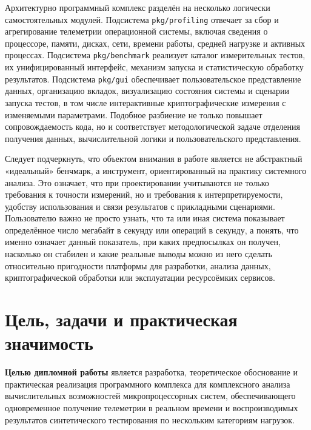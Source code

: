 Архитектурно программный комплекс разделён на несколько логически самостоятельных модулей. Подсистема \texttt{pkg/profiling} отвечает за сбор и агрегирование телеметрии операционной системы, включая сведения о процессоре, памяти, дисках, сети, времени работы, средней нагрузке и активных процессах. Подсистема \texttt{pkg/benchmark} реализует каталог измерительных тестов, их унифицированный интерфейс, механизм запуска и статистическую обработку результатов. Подсистема \texttt{pkg/gui} обеспечивает пользовательское представление данных, организацию вкладок, визуализацию состояния системы и сценарии запуска тестов, в том числе интерактивные криптографические измерения с изменяемыми параметрами. Подобное разбиение не только повышает сопровождаемость кода, но и соответствует методологической задаче отделения получения данных, вычислительной логики и пользовательского представления.

Следует подчеркнуть, что объектом внимания в работе является не абстрактный «идеальный» бенчмарк, а инструмент, ориентированный на практику системного анализа. Это означает, что при проектировании учитываются не только требования к точности измерений, но и требования к интерпретируемости, удобству использования и связи результатов с прикладными сценариями. Пользователю важно не просто узнать, что та или иная система показывает определённое число мегабайт в секунду или операций в секунду, а понять, что именно означает данный показатель, при каких предпосылках он получен, насколько он стабилен и какие реальные выводы можно из него сделать относительно пригодности платформы для разработки, анализа данных, криптографической обработки или эксплуатации ресурсоёмких сервисов.

\section*{Цель, задачи и практическая значимость}

\textbf{Целью дипломной работы} является разработка, теоретическое обоснование и практическая реализация программного комплекса для комплексного анализа вычислительных возможностей микропроцессорных систем, обеспечивающего одновременное получение телеметрии в реальном времени и воспроизводимых результатов синтетического тестирования по нескольким категориям нагрузок.

